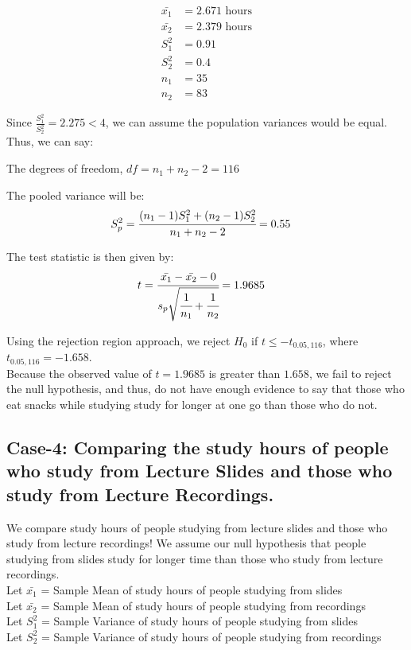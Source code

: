 \documentclass[12pt,onecolumn,letterpaper]{article}
\begin{document}
\begin{align}
    \bar{x_1} &= 2.671 \text{ hours}\\ 
    \bar{x_2} &= 2.379 \text{ hours} \\ 
    S^2_1 &= 0.91\\
    S^2_2 &= 0.4\\
    n_1 &= 35\\
    n_2 &= 83
\end{align}

Since $\frac{S_1^2}{S_2^2} = 2.275 < 4$, we can assume the population variances would be equal. Thus, we can say: \par The degrees of freedom, $df = n_1 + n_2 -2 = 116$

 The pooled variance will be:
 \begin{align}
     S_p^2 &= \cfrac{(n_1-1)S_1^2 + (n_2-1)S_2^2}{n_1+n_2-2} = 0.55
 \end{align}
      

The test statistic is then given by:
 \begin{align}
      t &= \cfrac{\bar{x_1} - \bar{x_2} - 0}{s_p\sqrt{\cfrac{1}{n_1} + \cfrac{1}{n_2}}} = 1.9685
 \end{align}

 \par
 Using the rejection region approach, we reject $H_0$ if $t \leq -t_{0.05, 116}$, where $t_{0.05,116} = -1.658$.\\ 
 Because the observed value of $t=1.9685$ is greater than $1.658$, we fail to reject the null hypothesis, and thus, do not have enough evidence to say that those who eat snacks while studying study for longer at one go than those who do not.


\subsection{Case-4: Comparing the study hours of people who study from Lecture Slides and those who study from Lecture Recordings.}

We compare study hours of people studying from lecture slides and those who study from lecture recordings! We assume our null hypothesis that people studying from slides study for longer time than those who study from lecture recordings.\\

Let $\bar{x_1}$ = Sample Mean of study hours of people studying from slides \\
Let $\bar{x_2}$ = Sample Mean of study hours of people studying from recordings \\
Let $S_1^2$ = Sample Variance of study hours of people studying from slides \\
Let $S_2^2$ = Sample Variance of study hours of people studying from recordings \\ 
\end{document}

